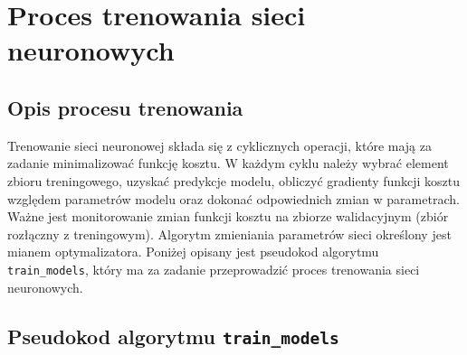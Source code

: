 \chapter{Proces trenowania sieci neuronowych}
\thispagestyle{chapterBeginStyle}

\section{Opis procesu trenowania}

Trenowanie sieci neuronowej składa się z cyklicznych operacji, które mają za zadanie minimalizować funkcję kosztu. W każdym cyklu należy wybrać element zbioru treningowego, uzyskać predykcje modelu, obliczyć gradienty funkcji kosztu względem parametrów modelu oraz dokonać odpowiednich zmian w parametrach. Ważne jest monitorowanie zmian funkcji kosztu na zbiorze walidacyjnym (zbiór rozłączny z treningowym). Algorytm zmieniania parametrów sieci określony jest mianem optymalizatora. Poniżej opisany jest pseudokod algorytmu \texttt{train\_models}, który ma za zadanie przeprowadzić proces trenowania sieci neuronowych.

\section{Pseudokod algorytmu \texttt{train\_models}}


